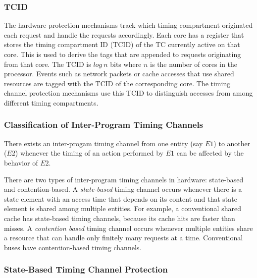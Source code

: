 \subsubsection{TCID}

The hardware protection mechanisms track which timing compartment originated 
each request and handle the requests accordingly. Each core has a register that 
stores the timing compartment ID (TCID) of the TC currently active on that 
core. This is used to derive the tags that are appended to requests originating 
from that core. The TCID is $log\ n$ bits where $n$ is the number of cores in 
the processor.
Events such as network packets or cache accesses that use shared resources are 
tagged with the TCID of the corresponding core.  The timing channel protection 
mechanisms use this TCID to distinguish accesses
from among different timing compartments.

\subsubsection{Classification of Inter-Program Timing Channels}

There exists an inter-progam timing channel from one entity (say $E1$)
to another ($E2$) whenever the timing of an action performed by $E1$ can be affected by 
the behavior of $E2$.

There are two types of inter-program timing channels in hardware: state-based
and contention-based.
A \emph{state-based} timing channel occurs whenever there is a state element 
with an access time that depends on its content and that state element is 
shared among multiple entities.
For example, a conventional shared cache has state-based timing channels, 
because its cache hits are faster than misses.
A \emph{contention based} timing channel occurs whenever multiple entities 
share a resource that can handle only finitely many requests at a time.
Conventional buses have contention-based timing channels.

\subsubsection{State-Based Timing Channel Protection}

